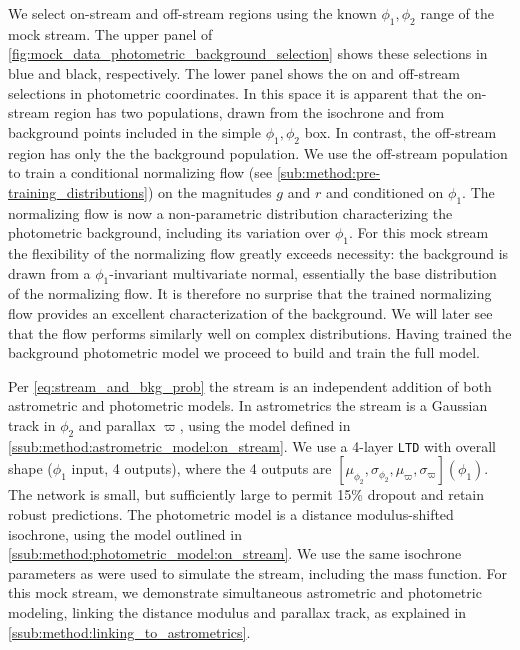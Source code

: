 \documentclass[twocolumn]{aastex631}
\newcommand{\parallax}{\varpi}
\begin{document}
        We select on-stream and off-stream regions using the known $\phi_1,
        \phi_2$ range of the mock stream.  The upper panel of
        \autoref{fig:mock_data_photometric_background_selection} shows these
        selections in blue and black, respectively.  The lower panel shows the
        on and off-stream selections in photometric coordinates.  In this space
        it is apparent that the on-stream region has two populations, drawn from
        the isochrone and from background points included in the simple $\phi_1,
        \phi_2$ box.  In contrast, the off-stream region has only the the
        background population.  We use the off-stream population to train a
        conditional normalizing flow (see
        \autoref{sub:method:pre-training_distributions}) on the magnitudes $g$
        and $r$ and conditioned on $\phi_1$.  The normalizing flow is now a
        non-parametric distribution characterizing the photometric background,
        including its variation over $\phi_1$.  For this mock stream the
        flexibility of the normalizing flow greatly exceeds necessity: the
        background is drawn from a $\phi_1$-invariant multivariate normal,
        essentially the base distribution of the normalizing flow.  It is
        therefore no surprise that the trained normalizing flow provides an
        excellent characterization of the background.  We will later see that
        the flow performs similarly well on complex distributions.  Having
        trained the background photometric model we proceed to build and train
        the full model.

        Per \autoref{eq:stream_and_bkg_prob} the stream is an independent
        addition of both astrometric and photometric models.  In astrometrics
        the stream is a Gaussian track in $\phi_2$ and parallax $\parallax$,
        using the model defined in
        \autoref{ssub:method:astrometric_model:on_stream}.  We use a 4-layer
        \texttt{LTD} with overall shape ($\phi_1$ input, 4 outputs), where the 4
        outputs are $[\mu_{\phi_2}, \sigma_{\phi_2}, \mu_{\parallax},
        \sigma_{\parallax}](\phi_1)$.  The network is small, but sufficiently
        large to permit 15\% dropout and retain robust predictions.  The
        photometric model is a distance modulus-shifted isochrone, using the
        model outlined in  \autoref{ssub:method:photometric_model:on_stream}. We
        use the same isochrone parameters as were used to simulate the stream,
        including the \citet{GrillmairSmith2001} mass function.  For this mock
        stream, we demonstrate simultaneous astrometric and photometric
        modeling, linking the distance modulus and parallax track, as explained
        in \autoref{ssub:method:linking_to_astrometrics}.
\end{document}
